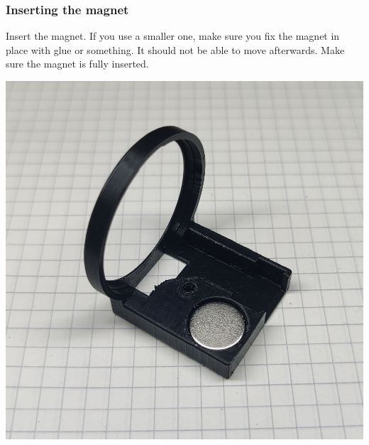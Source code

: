\documentclass[]{article}
\begin{document}
\subsubsection{Inserting the magnet}
\begin{minipage}[t]{0.5\linewidth}
	\vspace{0pt}
	Insert the magnet. If you use a smaller one, make sure you fix the magnet in place with glue or something. It should not be able to move afterwards. Make sure the magnet is fully inserted.
\end{minipage}
\hfill
\begin{minipage}[t]{0.4\linewidth}
	\vspace{0pt}
	\includegraphics[width=\linewidth]{images/01_displayunit/11_insert_magnet.jpg}
\end{minipage}
\end{document}
